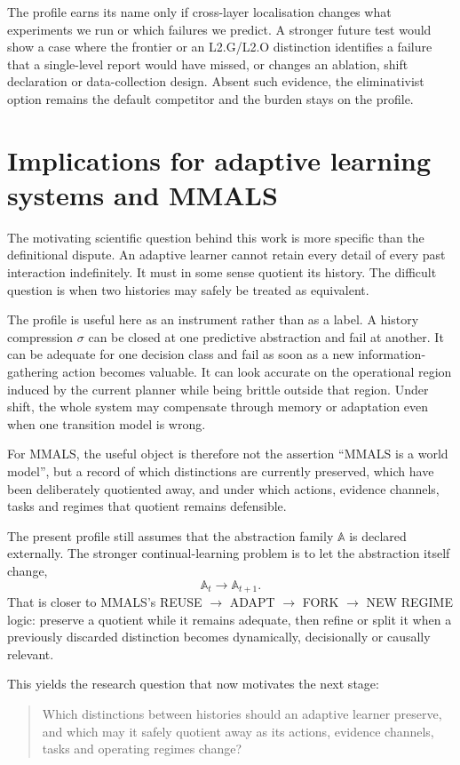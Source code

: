 \documentclass[10pt]{article}
\newcommand{\Aabs}{\mathbb A}
\begin{document}
The profile earns its name only if cross-layer localisation changes what experiments we run or which failures we predict. A stronger future test would show a case where the frontier or an L2.G/L2.O distinction identifies a failure that a single-level report would have missed, or changes an ablation, shift declaration or data-collection design. Absent such evidence, the eliminativist option remains the default competitor and the burden stays on the profile.

\section{Implications for adaptive learning systems and MMALS}

The motivating scientific question behind this work is more specific than the definitional dispute. An adaptive learner cannot retain every detail of every past interaction indefinitely. It must in some sense quotient its history. The difficult question is when two histories may safely be treated as equivalent.

The profile is useful here as an instrument rather than as a label. A history compression $\sigma$ can be closed at one predictive abstraction and fail at another. It can be adequate for one decision class and fail as soon as a new information-gathering action becomes valuable. It can look accurate on the operational region induced by the current planner while being brittle outside that region. Under shift, the whole system may compensate through memory or adaptation even when one transition model is wrong.

For MMALS, the useful object is therefore not the assertion ``MMALS is a world model'', but a record of which distinctions are currently preserved, which have been deliberately quotiented away, and under which actions, evidence channels, tasks and regimes that quotient remains defensible.

The present profile still assumes that the abstraction family $\Aabs$ is declared externally. The stronger continual-learning problem is to let the abstraction itself change,
\[
\Aabs_t\rightarrow\Aabs_{t+1}.
\]
That is closer to MMALS's REUSE $\rightarrow$ ADAPT $\rightarrow$ FORK $\rightarrow$ NEW REGIME logic: preserve a quotient while it remains adequate, then refine or split it when a previously discarded distinction becomes dynamically, decisionally or causally relevant.

This yields the research question that now motivates the next stage:
\begin{quote}
Which distinctions between histories should an adaptive learner preserve, and which may it safely quotient away as its actions, evidence channels, tasks and operating regimes change?
\end{quote}
\end{document}
